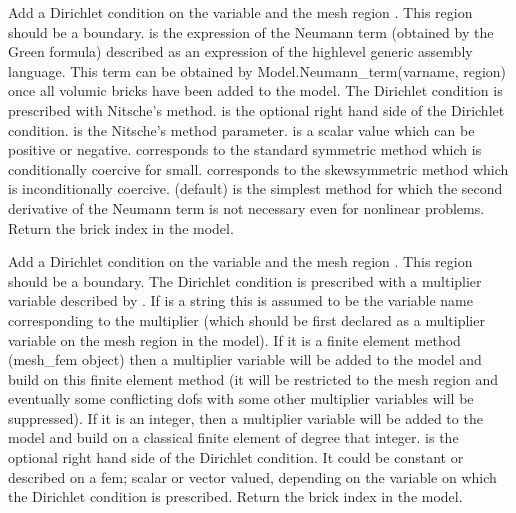 \documentclass[a4paper,11pt,english]{sphinxmanual}
\begin{document}
\begin{fulllineitems}
\begin{fulllineitems}
Add a Dirichlet condition on the variable  and the mesh
region . This region should be a boundary. 
is the expression of the Neumann term (obtained by the Green formula)
described as an expression of the high\sphinxhyphen{}level
generic assembly language. This term can be obtained by 
Model.Neumann\_term(varname, region) once all volumic bricks have
been added to the model. The Dirichlet
condition is prescribed with Nitsche’s method.  is the optional
right hand side of the Dirichlet condition.  is the
Nitsche’s method parameter.  is a scalar value which can be
positive or negative.  corresponds to the standard symmetric
method which is conditionally coercive for   small.
 corresponds to the skew\sphinxhyphen{}symmetric method which is
inconditionally coercive.  (default) is the simplest method
for which the second derivative of the Neumann term is not necessary
even for nonlinear problems. Return the brick index in the model.

\end{fulllineitems}


\begin{fulllineitems}
\label{\detokenize{python/cmdref_Model:getfem.Model.add_Dirichlet_condition_with_multipliers}}
Add a Dirichlet condition on the variable  and the mesh
region . This region should be a boundary. The Dirichlet
condition is prescribed with a multiplier variable described by
. If  is a string this is assumed
to be the variable name corresponding to the multiplier (which should be
first declared as a multiplier variable on the mesh region in the model).
If it is a finite element method (mesh\_fem object) then a multiplier
variable will be added to the model and build on this finite element
method (it will be restricted to the mesh region  and eventually
some conflicting dofs with some other multiplier variables will be
suppressed). If it is an integer, then a  multiplier variable will be
added to the model and build on a classical finite element of degree
that integer.  is the optional right hand side of  the
Dirichlet condition. It could be constant or described on a fem; scalar
or vector valued, depending on the variable on which the Dirichlet
condition is prescribed. Return the brick index in the model.


\end{fulllineitems}
\end{fulllineitems}
\end{document}

